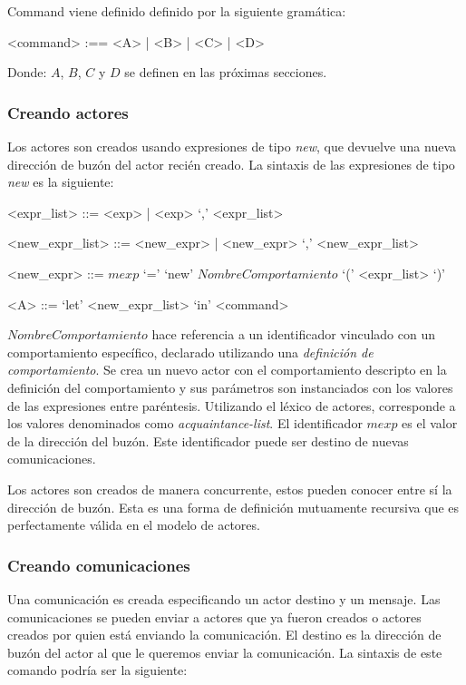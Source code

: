 Command viene definido definido por la siguiente gramática:
\begin{grammar}
<command> :== <A> | <B> | <C> | <D>
\end{grammar}

Donde: $A$, $B$, $C$ y $D$ se definen en las próximas secciones.

\subsubsection*{Creando actores}
Los actores son creados usando expresiones de tipo \textit{new}, que devuelve una nueva dirección de buzón del actor recién creado. La sintaxis de las expresiones de tipo \textit{new} es la siguiente:

\begin{grammar}
  <expr_list> ::= <exp> | <exp> `,' <expr_list>  

  <new_expr_list> ::= <new_expr> | <new_expr> `,' <new_expr_list>
  
  <new_expr> ::= $mexp$ `=' `new' $NombreComportamiento$ `(' <expr_list> `)'
  
  <A> ::=  `let' <new_expr_list> `in' <command> 
\end{grammar}

$NombreComportamiento$ hace referencia a un identificador vinculado con un comportamiento específico, declarado utilizando una \textit{definición de comportamiento}. Se crea un nuevo actor con el comportamiento descripto en la definición del comportamiento y sus parámetros son instanciados con los valores de las expresiones entre paréntesis. Utilizando el léxico de actores, corresponde a los valores denominados como \textit{acquaintance-list}. El identificador $mexp$ es el valor de la dirección del buzón. Este identificador puede ser destino de nuevas comunicaciones. 

Los actores son creados de manera concurrente, estos pueden conocer entre sí la dirección de buzón. Esta es una forma de definición mutuamente recursiva que es perfectamente válida en el modelo de actores. 


\subsubsection*{Creando comunicaciones}
Una comunicación es creada especificando un actor destino y un mensaje. Las comunicaciones se pueden enviar a actores que ya fueron creados o actores creados por quien está enviando la comunicación. El destino es la dirección de buzón del actor al que le queremos enviar la comunicación. La sintaxis de este comando podría ser la siguiente:

